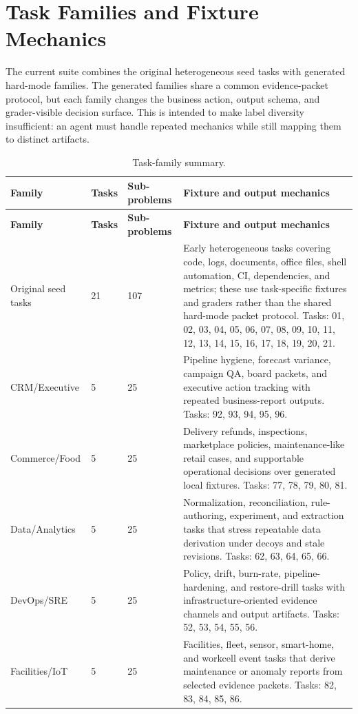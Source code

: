 \documentclass[11pt]{article}
\begin{document}
\section{Task Families and Fixture Mechanics}
\label{app:task-families}
The current suite combines the original heterogeneous seed tasks with generated hard-mode families. The generated families share a common evidence-packet protocol, but each family changes the business action, output schema, and grader-visible decision surface. This is intended to make label diversity insufficient: an agent must handle repeated mechanics while still mapping them to distinct artifacts.
\begingroup
\small
\setlength{\tabcolsep}{3pt}
\begin{longtable}{L{0.18\textwidth}L{0.09\textwidth}L{0.13\textwidth}L{0.52\textwidth}}
\caption{Task-family summary.}\label{tab:task-family-summary}\\
\toprule
\textbf{Family} & \textbf{Tasks} & \textbf{Sub-problems} & \textbf{Fixture and output mechanics} \\
\midrule
\endfirsthead
\toprule
\textbf{Family} & \textbf{Tasks} & \textbf{Sub-problems} & \textbf{Fixture and output mechanics} \\
\midrule
\endhead
Original seed tasks & 21 & 107 & Early heterogeneous tasks covering code, logs, documents, office files, shell automation, CI, dependencies, and metrics; these use task-specific fixtures and graders rather than the shared hard-mode packet protocol. Tasks: 01, 02, 03, 04, 05, 06, 07, 08, 09, 10, 11, 12, 13, 14, 15, 16, 17, 18, 19, 20, 21. \\
CRM/Executive & 5 & 25 & Pipeline hygiene, forecast variance, campaign QA, board packets, and executive action tracking with repeated business-report outputs. Tasks: 92, 93, 94, 95, 96. \\
Commerce/Food & 5 & 25 & Delivery refunds, inspections, marketplace policies, maintenance-like retail cases, and supportable operational decisions over generated local fixtures. Tasks: 77, 78, 79, 80, 81. \\
Data/Analytics & 5 & 25 & Normalization, reconciliation, rule-authoring, experiment, and extraction tasks that stress repeatable data derivation under decoys and stale revisions. Tasks: 62, 63, 64, 65, 66. \\
DevOps/SRE & 5 & 25 & Policy, drift, burn-rate, pipeline-hardening, and restore-drill tasks with infrastructure-oriented evidence channels and output artifacts. Tasks: 52, 53, 54, 55, 56. \\
Facilities/IoT & 5 & 25 & Facilities, fleet, sensor, smart-home, and workcell event tasks that derive maintenance or anomaly reports from selected evidence packets. Tasks: 82, 83, 84, 85, 86. \\

\end{longtable}
\end{document}
